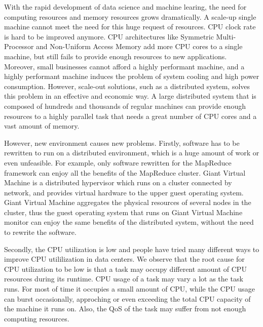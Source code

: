 \begin{bigabstract}

With the rapid development of data science and machine learing, the need for computing resources and memory resources grows dramatically. A scale-up single machine cannot meet the need for this huge request of resources. CPU clock rate is hard to be improved anymore. CPU architectures like Symmetric Multi-Processor and Non-Uniform Access Memory add more CPU cores to a single machine, but still fails to provide enough resources to new applications. Moreover, small businesses cannot afford a highly performant machine, and a highly performant machine induces the problem of system cooling and high power consumption. However, scale-out solutions, such as a distributed system, solves this problem in an effective and economic way. A large distributed system that is composed of hundreds and thousands of regular machines can provide enough resources to a highly parallel task that needs a great number of CPU cores and a vast amount of memory. 

However, new environment causes new problems. Firstly, software has to be rewritten to run on a distributed environment, which is a huge amount of work or even unfeasible. For example, only software rewritten for the MapReduce framework can enjoy all the benefits of the MapReduce cluster. Giant Virtual Machine is a distributed hypervisor which runs on a cluster connected by network, and provides virtual hardware to the upper guest operating system. Giant Virtual Machine aggregates the physical resources of several nodes in the cluster, thus the guest operating system that runs on Giant Virtual Machine monitor can enjoy the same benefits of the distributed system, without the need to rewrite the software.

Secondly, the CPU utilization is low and people have tried many different ways to improve CPU utililization in data centers. We observe that the root cause for CPU utilization to be low is that a task may occupy different amount of CPU resources during its runtime. CPU usage of a task may vary a lot as the task runs. For most of time it occupies a small amount of CPU, while the CPU usage can burst occasionally, approching or even exceeding the total CPU capacity of the machine it runs on. Also, the QoS of the task may suffer from not enough computing resources. 


\end{bigabstract}
